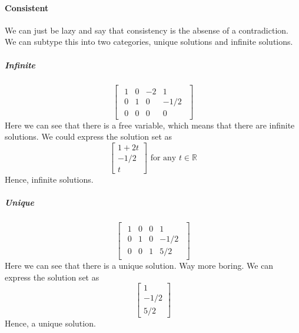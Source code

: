 \documentclass{article}
\begin{document}
            \paragraph{Consistent}
                We can just be lazy and say that consistency is the absense
                of a contradiction. We can subtype this into two categories,
                unique solutions and infinite solutions.
                \subparagraph{Infinite}
                    \[
                    \begin{bmatrix}
                    \begin{array}{ccc|c}
                        1 &  0 &  -2 & 1 \\
                        0 &  1 &  0 & -1/2 \\
                        0 &  0 &  0 & 0
                    \end{array}
                    \end{bmatrix}
                    \]
                    Here we can see that there is a free variable,
                    which means that there are infinite solutions.
                    We could express the solution set as
                    \[
                        \begin{bmatrix}
                            1 + 2t\\
                            -1/2\\
                            t
                        \end{bmatrix}
                        \text{ for any } t \in \mathbb{R}
                    \]
                    Hence, infinite solutions.
                \subparagraph{Unique}
                    \[
                    \begin{bmatrix}
                    \begin{array}{ccc|c}
                        1 &  0 &  0 & 1 \\
                        0 &  1 &  0 & -1/2 \\
                        0 &  0 &  1 & 5/2
                    \end{array}
                    \end{bmatrix}
                    \]
                    Here we can see that there is a unique solution.
                    Way more boring.
                    We can express the solution set as
                    \[
                        \begin{bmatrix}
                            1\\
                            -1/2\\
                            5/2
                        \end{bmatrix}
                    \]
                    Hence, a unique solution.
\end{document}
